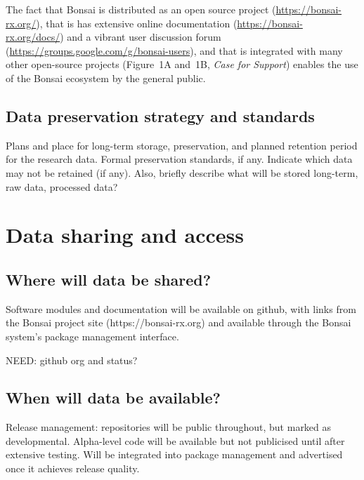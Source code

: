 \documentclass[a4paper,11pt]{article}
\begin{document}
The fact that Bonsai is distributed as an open source project
(\url{https://bonsai-rx.org/}), that is has extensive online documentation
(\url{https://bonsai-rx.org/docs/}) and a vibrant user discussion forum
(\url{https://groups.google.com/g/bonsai-users}), and that is integrated with
many other open-source projects (Figure~1A and~1B, \emph{Case for Support})
enables the use of the Bonsai ecosystem by the general public.


\subsection{Data preservation strategy and standards}

Plans and place for long-term storage, preservation, and planned retention period for the research data. Formal preservation standards, if any. Indicate which data may not be retained (if any). Also, briefly describe what will be stored long-term, raw data, processed data?

\section{Data sharing and access}
\subsection{Where will data be shared?}
Software modules and documentation will be available on github, with links from the Bonsai project site (https://bonsai-rx.org) and available through the Bonsai system's package management interface.

NEED: github org and status?


\subsection{When will data be available?}

Release management: repositories will be public throughout, but marked as developmental.  Alpha-level code will be available but not publicised until after extensive testing.  Will be integrated into package management and advertised once it achieves release quality.
\end{document}
